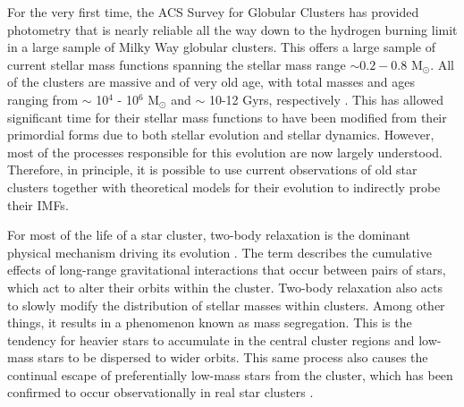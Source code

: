 For the very first time, the ACS Survey for Globular Clusters has
provided photometry that is nearly reliable all the way down to the
hydrogen burning limit in a large sample of Milky Way globular
clusters.  This offers a 
large sample of current stellar mass functions spanning the stellar mass range
$\sim 0.2 - 0.8$ M$_{\odot}$.  All of the
clusters are massive and of very old age, with total masses and ages
ranging from $\sim$ 10$^4$ - 10$^6$ M$_{\odot}$ and $\sim$ 10-12 Gyrs,
respectively 
\citep{harris96, deangeli05}.  This has allowed significant time for
their stellar mass functions to have been modified from their
primordial forms due to both stellar evolution and stellar dynamics.
However, most of the processes responsible for this evolution are now
largely understood.  Therefore, in principle, it is possible to use
current observations of old star clusters together with theoretical models
for their evolution to indirectly probe their IMFs.  

For most of the life of a star cluster, two-body relaxation is the
dominant physical mechanism driving its evolution
\citep[e.g.][]{heggie03, gieles11}.  
The term describes the cumulative effects of long-range gravitational
interactions that occur between pairs of
stars, which act to alter their orbits within the cluster.  Two-body
relaxation also acts to slowly modify the distribution of stellar masses
within clusters.  Among other things, it results in a 
phenomenon known as mass segregation.  This is the tendency for
heavier stars to accumulate in the central cluster regions and
low-mass stars to be dispersed to wider orbits.  This same process
also causes the continual escape of preferentially low-mass stars from
the cluster, which has been confirmed to occur observationally in real
star clusters \citep[e.g.][]{vonhippel98, demarchi10}.  

